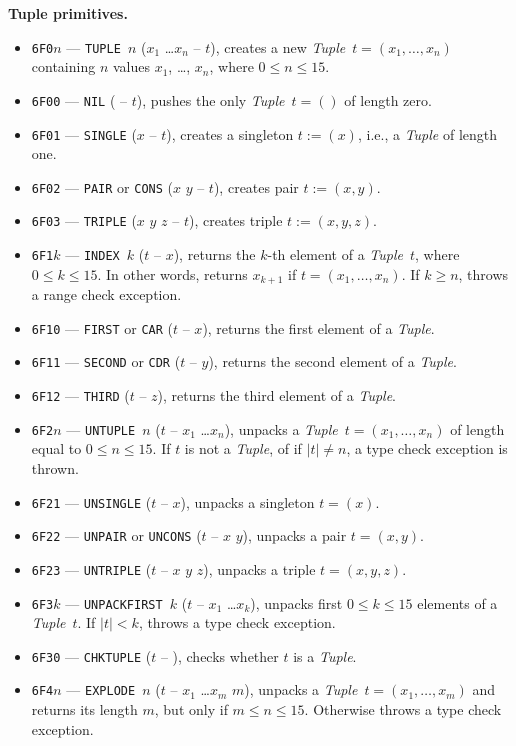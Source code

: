 \documentclass[12pt,oneside]{article}
\def\makepoint#1{\medbreak\noindent{\bf #1.\ }}
\def\nxsubpoint{\refstepcounter{subsubsection}%
    \smallbreak\makepoint{\thesubsubsection}}
\def\emb#1{\textbf{#1.}}
\begin{document}
\nxsubpoint\emb{Tuple primitives}\label{sp:prim.tuple}
\begin{itemize}
\item {\tt 6F0$n$} --- {\tt TUPLE $n$} ($x_1$ \dots $x_n$ -- $t$), creates a new {\em Tuple\/}~$t=(x_1,\ldots,x_n)$ containing $n$ values $x_1$, \dots, $x_n$, where $0\leq n\leq 15$.
\item {\tt 6F00} --- {\tt NIL} ( -- $t$), pushes the only {\em Tuple\/}~$t=()$ of length zero.
\item {\tt 6F01} --- {\tt SINGLE} ($x$ -- $t$), creates a singleton $t:=(x)$, i.e., a {\em Tuple\/} of length one.
\item {\tt 6F02} --- {\tt PAIR} or {\tt CONS} ($x$ $y$ -- $t$), creates pair $t:=(x,y)$.
\item {\tt 6F03} --- {\tt TRIPLE} ($x$ $y$ $z$ -- $t$), creates triple $t:=(x,y,z)$.
\item {\tt 6F1$k$} --- {\tt INDEX $k$} ($t$ -- $x$), returns the $k$-th element of a {\em Tuple\/}~$t$, where $0\leq k\leq 15$. In other words, returns $x_{k+1}$ if $t=(x_1,\ldots,x_n)$. If $k\geq n$, throws a range check exception.
\item {\tt 6F10} --- {\tt FIRST} or {\tt CAR} ($t$ -- $x$), returns the first element of a {\em Tuple}.
\item {\tt 6F11} --- {\tt SECOND} or {\tt CDR} ($t$ -- $y$), returns the second element of a {\em Tuple}.
\item {\tt 6F12} --- {\tt THIRD} ($t$ -- $z$), returns the third element of a {\em Tuple}.
\item {\tt 6F2$n$} --- {\tt UNTUPLE $n$} ($t$ -- $x_1$ \dots $x_n$), unpacks a {\em Tuple\/}~$t=(x_1,\ldots,x_n)$ of length equal to $0\leq n\leq 15$. If $t$ is not a {\em Tuple}, of if $|t|\neq n$, a type check exception is thrown.
\item {\tt 6F21} --- {\tt UNSINGLE} ($t$ -- $x$), unpacks a singleton $t=(x)$.
\item {\tt 6F22} --- {\tt UNPAIR} or {\tt UNCONS} ($t$ -- $x$ $y$), unpacks a pair $t=(x,y)$.
\item {\tt 6F23} --- {\tt UNTRIPLE} ($t$ -- $x$ $y$ $z$), unpacks a triple $t=(x,y,z)$.
\item {\tt 6F3$k$} --- {\tt UNPACKFIRST $k$} ($t$ -- $x_1$ \dots $x_k$), unpacks first $0\leq k\leq 15$ elements of a {\em Tuple\/}~$t$. If $|t|<k$, throws a type check exception.
\item {\tt 6F30} --- {\tt CHKTUPLE} ($t$ -- ), checks whether $t$ is a {\em Tuple}.
\item {\tt 6F4$n$} --- {\tt EXPLODE $n$} ($t$ -- $x_1$ \dots $x_m$ $m$), unpacks a {\em Tuple\/}~$t=(x_1,\ldots,x_m)$ and returns its length $m$, but only if $m\leq n\leq 15$. Otherwise throws a type check exception.

\end{itemize}
\end{document}
